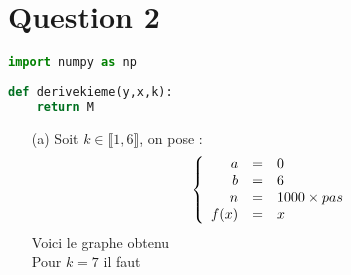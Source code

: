 \section*{Question 2}

\begin{lstlisting}[language=Python]
import numpy as np
    
def derivekieme(y,x,k):
    return M
\end{lstlisting}


\begin{enumerate}
    \item[(a)]
    Soit $k\in  \llbracket1,6\rrbracket$, on pose : 
    \[
        \left\{
            \begin{array}{r c l}
                a &=& 0\\
                b &=& 6\\
                n &=& 1000 \times pas\\
                f(x) &=& x
            \end{array}
        \right.
    \]
    Voici le graphe obtenu\\
    Pour $k = 7$ il faut
\end{enumerate}